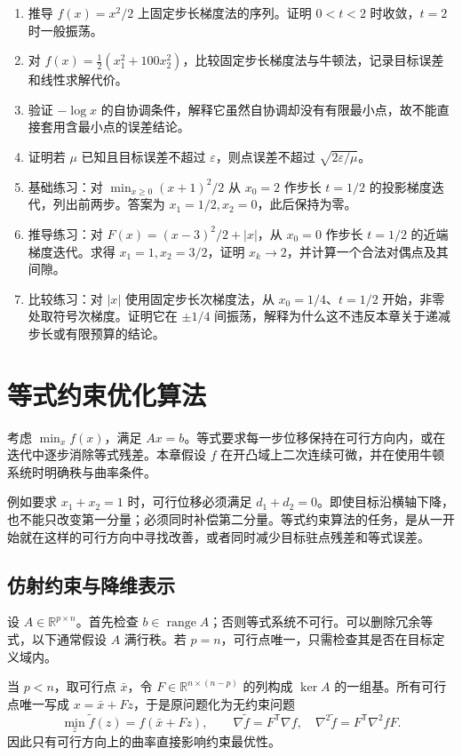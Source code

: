 \documentclass[UTF8,12pt,a4paper,fontset=fandol]{ctexbook}
\begin{document}
\begin{enumerate}
 \item 推导 $f(x)=x^2/2$ 上固定步长梯度法的序列。证明 $0<t<2$ 时收敛，$t=2$ 时一般振荡。
 \item 对 $f(x)=\tfrac12(x_1^2+100x_2^2)$，比较固定步长梯度法与牛顿法，记录目标误差和线性求解代价。
 \item 验证 $-\log x$ 的自协调条件，解释它虽然自协调却没有有限最小点，故不能直接套用含最小点的误差结论。
 \item 证明若 $\mu$ 已知且目标误差不超过 $\varepsilon$，则点误差不超过 $\sqrt{2\varepsilon/\mu}$。
 \item 基础练习：对 $\min_{x\geq0}(x+1)^2/2$ 从 $x_0=2$ 作步长 $t=1/2$ 的投影梯度迭代，列出前两步。答案为 $x_1=1/2,x_2=0$，此后保持为零。
 \item 推导练习：对 $F(x)=(x-3)^2/2+|x|$，从 $x_0=0$ 作步长 $t=1/2$ 的近端梯度迭代。求得 $x_1=1,x_2=3/2$，证明 $x_k\to2$，并计算一个合法对偶点及其间隙。
 \item 比较练习：对 $|x|$ 使用固定步长次梯度法，从 $x_0=1/4$、$t=1/2$ 开始，非零处取符号次梯度。证明它在 $\pm1/4$ 间振荡，解释为什么这不违反本章关于递减步长或有限预算的结论。
\end{enumerate}

\chapter{等式约束优化算法}
\label{ch:co-equality}

考虑 $\min_x f(x)$，满足 $Ax=b$。等式要求每一步位移保持在可行方向内，或在迭代中逐步消除等式残差。本章假设 $f$ 在开凸域上二次连续可微，并在使用牛顿系统时明确秩与曲率条件。

例如要求 $x_1+x_2=1$ 时，可行位移必须满足 $d_1+d_2=0$。即使目标沿横轴下降，也不能只改变第一分量；必须同时补偿第二分量。等式约束算法的任务，是从一开始就在这样的可行方向中寻找改善，或者同时减少目标驻点残差和等式误差。

\section{仿射约束与降维表示}

设 $A\in\mathbb R^{p\times n}$。首先检查 $b\in\operatorname{range}A$；否则等式系统不可行。可以删除冗余等式，以下通常假设 $A$ 满行秩。若 $p=n$，可行点唯一，只需检查其是否在目标定义域内。

当 $p<n$，取可行点 $\bar x$，令 $F\in\mathbb R^{n\times(n-p)}$ 的列构成 $\ker A$ 的一组基。所有可行点唯一写成 $x=\bar x+Fz$，于是原问题化为无约束问题
\[
 \min_z\widetilde f(z)=f(\bar x+Fz),\qquad
 \nabla\widetilde f=F^{\mathsf T}\nabla f,\quad
 \nabla^2\widetilde f=F^{\mathsf T}\nabla^2fF.
\]
因此只有可行方向上的曲率直接影响约束最优性。
\end{document}
